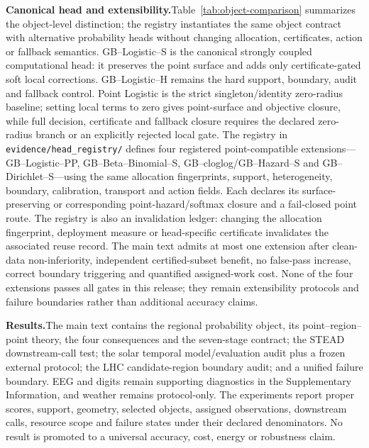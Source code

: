 \documentclass[10pt]{article}
\begin{document}
\textbf{Canonical head and extensibility.}\;Table~\ref{tab:object-comparison} summarizes the object-level distinction; the registry instantiates the same object contract with alternative probability heads without changing allocation, certificates, action or fallback semantics. GB--Logistic--S is the canonical strongly coupled computational head: it preserves the point surface and adds only certificate-gated soft local corrections. GB--Logistic--H remains the hard support, boundary, audit and fallback control. Point Logistic is the strict singleton/identity zero-radius baseline; setting local terms to zero gives point-surface and objective closure, while full decision, certificate and fallback closure requires the declared zero-radius branch or an explicitly rejected local gate. The registry in \texttt{evidence/head\_registry/} defines four registered point-compatible extensions—GB--Logistic--PP, GB--Beta--Binomial--S, GB--cloglog/GB--Hazard--S and GB--Dirichlet--S—using the same allocation fingerprints, support, heterogeneity, boundary, calibration, transport and action fields. Each declares its surface-preserving or corresponding point-hazard/softmax closure and a fail-closed point route. The registry is also an invalidation ledger: changing the allocation fingerprint, deployment measure or head-specific certificate invalidates the associated reuse record. The main text admits at most one extension after clean-data non-inferiority, independent certified-subset benefit, no false-pass increase, correct boundary triggering and quantified assigned-work cost. None of the four extensions passes all gates in this release; they remain extensibility protocols and failure boundaries rather than additional accuracy claims.

\textbf{Results.}\;The main text contains the regional probability object, its point--region--point theory, the four consequences and the seven-stage contract; the STEAD downstream-call test; the solar temporal model/evaluation audit plus a frozen external protocol; the LHC candidate-region boundary audit; and a unified failure boundary. EEG and digits remain supporting diagnostics in the Supplementary Information, and weather remains protocol-only. The experiments report proper scores, support, geometry, selected objects, assigned observations, downstream calls, resource scope and failure states under their declared denominators. No result is promoted to a universal accuracy, cost, energy or robustness claim.
\end{document}
